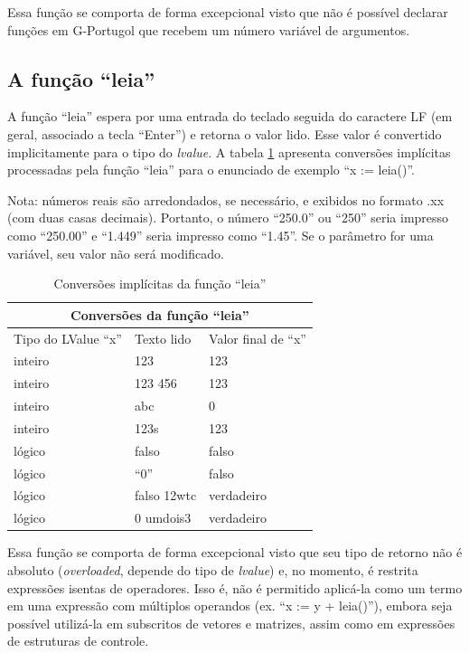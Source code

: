 \documentclass[a4paper,11pt]{report}
\begin{document}
Essa função se comporta de forma excepcional visto que não é possível declarar
funções em G-Portugol que recebem um número variável de argumentos.

\subsection{A função ``leia''}

A função ``leia'' espera por uma entrada do teclado seguida do caractere LF (em
geral, associado a tecla ``Enter'') e retorna o valor lido. Esse valor é
convertido implicitamente para o tipo do \textit{lvalue}. A tabela
\ref{tb_leia_casts} apresenta conversões implícitas processadas pela função
``leia'' para o enunciado de exemplo ``x := leia()''.

Nota: números reais são arredondados, se necessário, e exibidos no formato .xx
(com duas casas decimais). Portanto, o número ``250.0'' ou ``250'' seria
impresso como ``250.00'' e ``1.449'' seria impresso como ``1.45''. Se o
parâmetro for uma variável, seu valor não será modificado.

\begin{table}[ht]
\begin{center}
  \begin{tabular}{|l|l|l|}
    \hline
    \multicolumn{3}{|c|}{Conversões da função ``leia''} \\
    \hline
      Tipo do LValue ``x'' & Texto lido & Valor final de ``x'' \\
    \hline
      inteiro & 123 & 123 \\
      inteiro & 123 456 & 123 \\
      inteiro & abc & 0 \\
      inteiro & 123s & 123 \\
      lógico  & falso & falso \\
      lógico & ``0'' & falso \\
      lógico & falso 12wtc & verdadeiro \\
      lógico & 0 umdois3 & verdadeiro\\
    \hline
  \end{tabular}
  \caption{Conversões implícitas da função ``leia'' \label{tb_leia_casts}}
\end{center}
\end{table}

Essa função se comporta de forma excepcional visto que seu tipo de retorno não é
absoluto (\textit{overloaded}, depende do tipo de \textit{lvalue}) e, no
momento, é restrita expressões isentas de operadores. Isso é, não é permitido
aplicá-la como um termo em uma expressão com múltiplos operandos (ex. ``x := y
+ leia()''), embora seja possível utilizá-la em subscritos de vetores e
matrizes, assim como em expressões de estruturas de controle.
\end{document}
